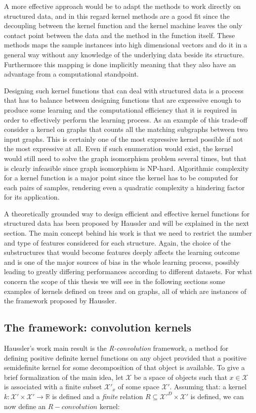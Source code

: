 A more effective approach would be to adapt the methods to work directly on
structured data, and in this regard kernel methods are a good fit since the
decoupling between the kernel function and the kernel machine leaves the
only contact point between the data and the method in the function itself.
These methods maps the sample instances into high dimensional vectors and do it
in a general way without any knowledge of the underlying data beside its structure.
Furthermore this mapping is done implicitly meaning that they also have an
advantage from a computational standpoint.

Designing such kernel functions that can deal with structured data is a process
that has to balance between designing functions that are expressive enough to
produce some learning and the computational efficiency that it is required in
order to effectively perform the learning process.
As an example of this trade-off consider a kernel on graphs that counts all the
matching subgraphs between two input graphs.
This is certainly one of the most expressive kernel possible if not the most expressive
at all.
Even if such enumeration would exist, the kernel would still need to solve the
graph isomorphism problem several times, but that is clearly infeasible since graph
isomorphism is NP-hard.
Algorithmic complexity for a kernel function is a major point since the kernel has
to be computed for each pairs of samples, rendering even a quadratic complexity
a hindering factor for its application.

A theoretically grounded way to design efficient and effective kernel functions for
structured data has been proposed by Haussler \cite{haussler99convolution} and will be explained
in the next section.
The main concept behind his work is that we need to restrict the number and type
of features considered for each structure.
Again, the choice of the substructures that would become features deeply affects
the learning outcome and is one of the major sources of bias in the whole learning
process, possibly leading to greatly differing performances according to different
datasets.
For what concern the scope of this thesis we will see in the following sections
some examples of kernels defined on trees and on graphs, all of which are instances
of the framework proposed by Haussler.

\subsection{The framework: convolution kernels}
\label{subsec:convolution}
Haussler's work \cite{haussler99convolution} main result is the \emph{R-convolution} framework,
a method for defining positive definite kernel functions on any object provided that a
positive semidefinite kernel for some decomposition of that object is available.
To give a brief formalization of the main idea, let $\mathcal{X}$ be a space of 
objects such that $x \in \mathcal{X}$ is associated with a finite subset
$\mathcal{X'_\mathit{x}}$ of some space $\mathcal{X'}$.
Assuming that: a kernel $k: \mathcal{X'}\times \mathcal{X'} \to \mathbb{R}$ is
defined and a \emph{finite} relation $R \subseteq \mathcal{X'}^D \times \mathcal{X'}$
is defined, we can now define an $R-convolution$ kernel:

